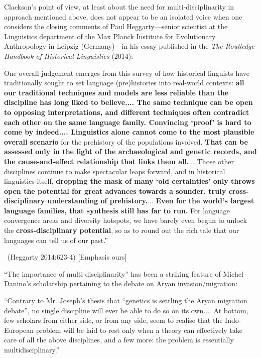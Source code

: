 \newpage

Clackson’s point of view, at least about the need for multi-disciplinarity in approach mentioned above, does not appear to be an isolated voice when one considers the closing comments of Paul Heggarty—senior scientist at the Linguistics department of the Max Planck Institute for Evolutionary Anthropology in Leipzig (Germany)—in his essay published in the \textit{The Routledge Handbook of Historical Linguistics }(2014):

\begin{myquote}
One overall judgement emerges from this survey of how historical linguists have traditionally sought to set language (pre)histories into real-world contexts: \textbf{all our traditional techniques and models are less reliable than the discipline has long liked to believe.... The same technique can be open to opposing interpretations, and different techniques often contradict each other on the same language family. Convincing ‘proof’ is hard to come by indeed.... Linguistics alone cannot come to the most plausible overall scenario} for the prehistory of the populations involved. \textbf{That can be assessed only in the light of the archaeological and genetic records, and the cause-and-effect relationship that links them all.}... Those other disciplines continue to make spectacular leaps forward, and in historical linguistics itself, \textbf{dropping the mask of many ‘old certainties’ only throws open the potential for great advances towards a sounder, truly cross-disciplinary understanding of prehistory.}... \textbf{Even for the world’s largest language families, that synthesis still has far to run.} For language convergence areas and diversity hotspots, we have barely even begun to unlock the \textbf{cross-disciplinary potential}, so as to round out the rich tale that our languages can tell us of our past.”

~\hfill (Heggarty 2014:623-4) [Emphasis ours]
\end{myquote}

“The importance of multi-disciplinarity” has been a striking feature of Michel Danino’s scholarship pertaining to the debate on Aryan invasion/migration:

\begin{myquote}
“Contrary to Mr. Joseph’s thesis that “genetics is settling the Aryan migration debate”, no single discipline will ever be able to do so on its own.... At bottom, few scholars from either side, or from any side, seem to realise that the Indo-European problem will be laid to rest only when a theory can effectively take care of all the above disciplines, and a few more: the problem is essentially multidisciplinary.”
\end{myquote}

